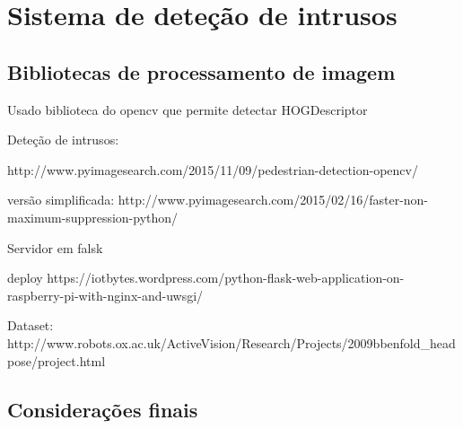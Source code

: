 

\chapter{Sistema de deteção de intrusos}


\section{Bibliotecas de processamento de imagem}


Usado biblioteca do opencv que permite detectar 
HOGDescriptor


Deteção de intrusos: 

http://www.pyimagesearch.com/2015/11/09/pedestrian-detection-opencv/



versão simplificada: http://www.pyimagesearch.com/2015/02/16/faster-non-maximum-suppression-python/



Servidor em falsk 


deploy 
https://iotbytes.wordpress.com/python-flask-web-application-on-raspberry-pi-with-nginx-and-uwsgi/



Dataset: http://www.robots.ox.ac.uk/ActiveVision/Research/Projects/2009bbenfold_headpose/project.html


\section{Considerações finais}


